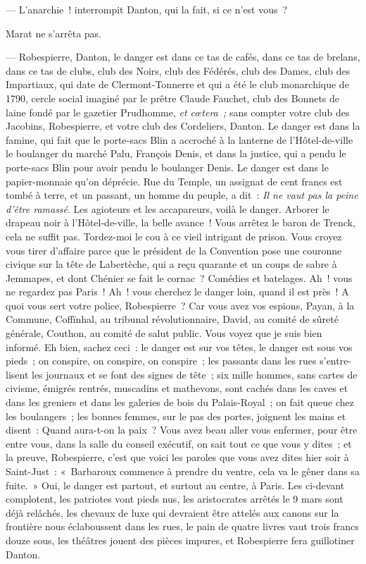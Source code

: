 \documentclass[french,twoside]{book} %
\begin{document}
— L’anarchie ! interrompit Danton, qui la fait, si ce n’est vous ?\par
Marat ne s’arrêta pas.\par
— Robespierre, Danton, le danger est dans ce tas de cafés, dans ce tas de brelans, dans ce tas de clubs, club des Noirs, club des Fédérés, club des Dames, club des Impartiaux, qui date de Clermont-Tonnerre et qui a été le club monarchique de 1790, cercle social imaginé par le prêtre Claude Fauchet, club des Bonnets de laine fondé par le gazetier Prudhomme, \emph{et cœtera ;} sans compter votre club des Jacobins, Robespierre, et votre club des Cordeliers, Danton. Le danger est dans la famine, qui fait que le porte-sacs Blin a accroché à la lanterne de l’Hôtel-de-ville le boulanger du marché Palu, François Denis, et dans la justice, qui a pendu le porte-sacs Blin pour avoir pendu le boulanger Denis. Le danger est dans le papier-monnaie qu’on déprécie. Rue du Temple, un assignat de cent francs est tombé à terre, et un passant, un homme du peuple, a dit : \emph{Il ne vaut pas la peine d’être ramassé}. Les agioteurs et les accapareurs, voilà le danger. Arborer le drapeau noir à l’Hôtel-de-ville, la belle avance ! Vous arrêtez le baron de Trenck, cela ne suffit pas. Tordez-moi le cou à ce vieil intrigant de prison. Vous croyez vous tirer d’affaire parce que le président de la Convention pose une couronne civique  sur la tête de Labertèche, qui a reçu quarante et un coups de sabre à Jemmapes, et dont Chénier se fait le cornac ? Comédies et batelages. Ah ! vous ne regardez pas Paris ! Ah ! vous cherchez le danger loin, quand il est près ! A quoi vous sert votre police, Robespierre ? Car vous avez vos espions, Payan, à la Commune, Coffïnhal, au tribunal révolutionnaire, David, au comité de sûreté générale, Couthon, au comité de salut public. Vous voyez que je suis bien informé. Eh bien, sachez ceci : le danger est sur vos têtes, le danger est sous vos pieds ; on conspire, on conspire, on conspire ; les passants dans les rues s’entre-lisent les journaux et se font des signes de tête ; six mille hommes, sans cartes de civisme, émigrés rentrés, muscadins et mathevons, sont cachés dans les caves et dans les greniers et dans les galeries de bois du Palais-Royal ; on fait queue chez les boulangers ; les bonnes femmes, sur le pas des portes, joignent les mains et disent : Quand aura-t-on la paix ? Vous avez beau aller vous enfermer, pour être entre vous, dans la salle du conseil exécutif, on sait tout ce que vous y dites ; et la preuve, Robespierre, c’est que voici les paroles que vous avez dites hier soir à Saint-Just : « Barbaroux commence à prendre du ventre, cela va le gêner dans sa fuite. » Oui, le danger est partout, et surtout au centre, à Paris. Les ci-devant complotent, les patriotes vont pieds nus, les aristocrates arrêtés le 9 mars sont déjà relâchés, les chevaux de luxe qui devraient être attelés aux canons sur la frontière nous éclaboussent dans les rues, le pain de  quatre livres vaut trois francs douze sous, les théâtres jouent des pièces impures, et Robespierre fera guillotiner Danton.\par
\end{document}
